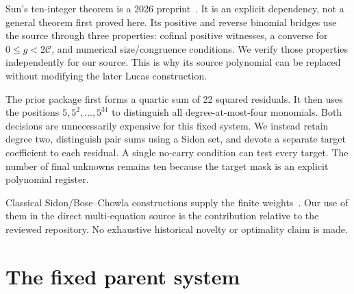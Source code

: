 \documentclass[11pt,letterpaper]{article}
\theoremstyle{definition}\newtheorem{definition}[theorem]{Definition}
\theoremstyle{remark}\newtheorem{remark}[theorem]{Remark}
\newcommand{\cC}{\mathcal C}
\begin{document}
Sun's ten-integer theorem is a 2026 preprint~\cite{sun2026}. It is an explicit dependency, not a general theorem first proved here. Its positive and reverse binomial bridges use the source through three properties: cofinal positive witnesses, a converse for $0\le g<2\cC$, and numerical size/congruence conditions. We verify those properties independently for our source. This is why its source polynomial can be replaced without modifying the later Lucas construction.

The prior package first forms a quartic sum of 22 squared residuals. It then uses the positions $5,5^2,\ldots,5^{31}$ to distinguish all degree-at-most-four monomials. Both decisions are unnecessarily expensive for this fixed system. We instead retain degree two, distinguish pair sums using a Sidon set, and devote a separate target coefficient to each residual. A single no-carry condition can test every target. The number of final unknowns remains ten because the target mask is an explicit polynomial register.

Classical Sidon/Bose--Chowla constructions supply the finite weights~\cite{nathanson}. Our use of them in the direct multi-equation source is the contribution relative to the reviewed repository. No exhaustive historical novelty or optimality claim is made.

\clearpage
\section{The fixed parent system}\label{sec:parent}
\end{document}
